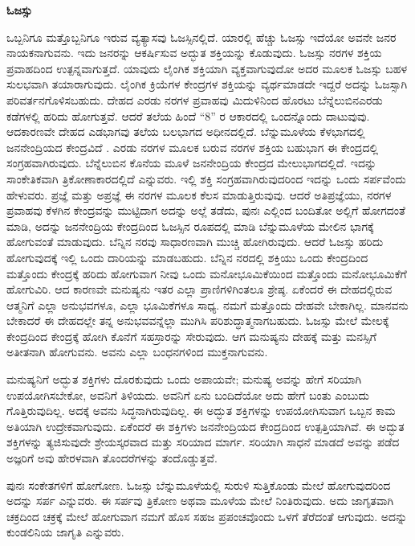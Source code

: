 \centerline{\textbf{ಓಜಸ್ಸು}}

ಒಬ್ಬನಿಗೂ ಮತ್ತೊಬ್ಬನಿಗೂ ಇರುವ ವ್ಯತ್ಯಾಸವು ಓಜಸ್ಸಿನಲ್ಲಿದೆ. ಯಾರಲ್ಲಿ ಹೆಚ್ಚು ಓಜಸ್ಸು ಇದೆಯೋ ಅವನೇ ಜನರ ನಾಯಕನಾಗುವನು. ಇದು ಜನರನ್ನು ಆಕರ್ಷಿಸುವ ಅದ್ಭುತ ಶಕ್ತಿಯನ್ನು ಕೊಡುವುದು. ಓಜಸ್ಸು ನರಗಳ ಶಕ್ತಿಯ ಪ್ರವಾಹದಿಂದ  ಉತ್ಪನ್ನವಾಗುತ್ತದೆ. ಯಾವುದು ಲೈಂಗಿಕ ಶಕ್ತಿಯಾಗಿ ವ್ಯಕ್ತವಾಗುವುದೋ ಅದರ ಮೂಲಕ ಓಜಸ್ಸು ಬಹಳ ಸುಲಭವಾಗಿ ತಯಾರಾಗುವುದು. ಲೈಂಗಿಕ ಕ್ರಿಯೆಗಳ ಕೇಂದ್ರಗಳ ಶಕ್ತಿಯನ್ನು ವ್ಯರ್ಥಮಾಡದೇ ಇದ್ದರೆ ಅದನ್ನು ಓಜಸ್ಸಾಗಿ ಪರಿವರ್ತನಗೊಳಿಸಬಹುದು. ದೇಹದ ಎರಡು ನರಗಳ ಪ್ರವಾಹವು ಮಿದುಳಿನಿಂದ ಹೊರಟು ಬೆನ್ನೆಲುಬಿನ\break ಎರಡು ಕಡೆಗಳಲ್ಲಿ ಹರಿದು ಹೋಗುತ್ತವೆ. ಆದರೆ ತಲೆಯ ಹಿಂದೆ “8” ರ ಆಕಾರದಲ್ಲಿ ಒಂದನ್ನೊಂದು ದಾಟುವುವು. ಆದಕಾರಣವೇ ದೇಹದ ಎಡಭಾಗವು ತಲೆಯ ಬಲಭಾಗದ ಅಧೀನದಲ್ಲಿದೆ. ಬೆನ್ನುಮೂಳೆಯ ಕೆಳಭಾಗದಲ್ಲಿ ಜನನೇಂದ್ರಿಯದ ಕೇಂದ್ರವಿದೆ . ಎರಡು ನರಗಳ ಮೂಲಕ ಬರುವ ನರಗಳ ಶಕ್ತಿಯ ಬಹುಭಾಗ ಈ ಕೇಂದ್ರದಲ್ಲಿ ಸಂಗ್ರಹವಾಗಿರುವುದು. ಬೆನ್ನೆಲುಬಿನ ಕೊನೆಯ ಮೂಳೆ ಜನನೇಂದ್ರಿಯ ಕೇಂದ್ರದ ಮೇಲುಭಾಗದಲ್ಲಿದೆ. ಇದನ್ನು ಸಾಂಕೇತಿಕವಾಗಿ ತ್ರಿಕೋಣಾಕಾರದಲ್ಲಿದೆ ಎನ್ನುವರು. ಇಲ್ಲಿ ಶಕ್ತಿ ಸಂಗ್ರಹವಾಗಿರುವುದರಿಂದ ಇದನ್ನು ಒಂದು ಸರ್ಪವೆಂದು ಹೇಳುವರು. ಪ್ರಜ್ಞೆ ಮತ್ತು ಅಪ್ರಜ್ಞೆ ಈ ನರಗಳ ಮೂಲಕ ಕೆಲಸ ಮಾಡುತ್ತಿರುವುವು. ಆದರೆ ಅತಿಪ್ರಜ್ಞೆಯು, ನರಗಳ ಪ್ರವಾಹವು ಕೆಳಗಿನ ಕೇಂದ್ರವನ್ನು ಮುಟ್ಟಿದಾಗ ಅದನ್ನು ಅಲ್ಲೆ ತಡೆದು, ಪುನಃ ಎಲ್ಲಿಂದ ಬಂದಿತೋ ಅಲ್ಲಿಗೆ ಹೋಗದಂತೆ ಮಾಡಿ, ಅದನ್ನು ಜನನೇಂದ್ರಿಯ ಕೇಂದ್ರದಿಂದ ಓಜಸ್ಸಿನ ರೂಪದಲ್ಲಿ ಮಾಡಿ ಬೆನ್ನುಮೂಳೆಯ ಮೇಲಿನ ಭಾಗಕ್ಕೆ ಹೋಗುವಂತೆ ಮಾಡುವುದು. ಬೆನ್ನಿನ ನರವು ಸಾಧಾರಣವಾಗಿ ಮುಚ್ಚಿ ಹೋಗಿರುವುದು. ಆದರೆ ಓಜಸ್ಸು ಹರಿದು ಹೋಗುವುದಕ್ಕೆ ಇಲ್ಲಿ ಒಂದು ದಾರಿಯನ್ನು ಮಾಡಬಹುದು. ಬೆನ್ನಿನ ನರದಲ್ಲಿ ಶಕ್ತಿಯು ಒಂದು ಕೇಂದ್ರದಿಂದ ಮತ್ತೊಂದು ಕೇಂದ್ರಕ್ಕೆ ಹರಿದು ಹೋಗುವಾಗ ನೀವು ಒಂದು ಮನೋಭೂಮಿಕೆಯಿಂದ ಮತ್ತೊಂದು ಮನೋಭೂಮಿಕೆಗೆ ಹೋಗುವಿರಿ. ಆದ ಕಾರಣವೇ ಮನುಷ್ಯನು ಇತರ ಎಲ್ಲಾ ಪ್ರಾಣಿಗಳಿಗಿಂತಲೂ ಶ್ರೇಷ್ಠ. ಏಕೆಂದರೆ ಈ ದೇಹದಲ್ಲಿರುವ ಆತ್ಮನಿಗೆ ಎಲ್ಲಾ ಅನುಭವಗಳೂ, ಎಲ್ಲಾ ಭೂಮಿಕೆಗಳೂ ಸಾಧ್ಯ. ನಮಗೆ ಮತ್ತೊಂದು ದೇಹವೇ ಬೇಕಾಗಿಲ್ಲ. ಮಾನವನು ಬೇಕಾದರೆ ಈ ದೇಹದಲ್ಲೇ ತನ್ನ ಅನುಭವವನ್ನೆಲ್ಲಾ ಮುಗಿಸಿ ಪರಿಶುದ್ಧಾತ್ಮನಾಗಬಹುದು. ಓಜಸ್ಸು ಮೇಲೆ ಮೇಲಕ್ಕೆ ಕೇಂದ್ರದಿಂದ ಕೇಂದ್ರಕ್ಕೆ ಹೋಗಿ ಕೊನೆಗೆ ಸಹಸ್ರಾರನ್ನು ಸೇರುವುದು. ಆಗ ಮನುಷ್ಯನು ದೇಹಕ್ಕೆ ಮತ್ತು ಮನಸ್ಸಿಗೆ ಅತೀತನಾಗಿ ಹೋಗುವನು. ಅವನು ಎಲ್ಲಾ ಬಂಧನಗಳಿಂದ ಮುಕ್ತನಾಗುವನು.

ಮನುಷ್ಯನಿಗೆ ಅದ್ಭುತ ಶಕ್ತಿಗಳು ದೊರಕುವುದು ಒಂದು ಅಪಾಯವೇ; ಮನುಷ್ಯ ಅವನ್ನು ಹೇಗೆ ಸರಿಯಾಗಿ ಉಪಯೋಗಿಸಬೇಕೋ, ಅವನಿಗೆ ತಿಳಿಯದು. ಅವನಿಗೆ ಏನು ಬಂದಿದೆಯೋ ಅದು ಹೇಗೆ ಬಂತು ಎಂಬುದು ಗೊತ್ತಿರುವುದಿಲ್ಲ. ಅದಕ್ಕೆ ಅವನು ಸಿದ್ಧನಾಗಿರುವುದಿಲ್ಲ. ಈ ಅದ್ಭುತ ಶಕ್ತಿಗಳನ್ನು ಉಪಯೋಗಿಸುವಾಗ ಒಬ್ಬನ ಕಾಮ ಅತಿಯಾಗಿ ಉದ್ರೇಕವಾಗುವುದು. ಏಕೆಂದರೆ ಈ ಶಕ್ತಿಗಳು ಜನನೇಂದ್ರಿಯದ ಕೇಂದ್ರದಿಂದ ಉತ್ಪತ್ತಿಯಾಗಿವೆ. ಈ ಅದ್ಭುತ ಶಕ್ತಿಗಳನ್ನು ತ್ಯಜಿಸುವುದೇ ಶ್ರೇಯಸ್ಕರವಾದ ಮತ್ತು ಸರಿಯಾದ ಮಾರ್ಗ. ಸರಿಯಾಗಿ ಸಾಧನೆ ಮಾಡದೆ ಅವನ್ನು ಪಡೆದ ಅಜ್ಞರಿಗೆ ಅವು ಹೇರಳವಾಗಿ ತೊಂದರೆಗಳನ್ನು ತಂದೊಡ್ಡುತ್ತವೆ.

ಪುನಃ ಸಂಕೇತಗಳಿಗೆ ಹೋಗೋಣ. ಓಜಸ್ಸು ಬೆನ್ನುಮೂಳೆಯಲ್ಲಿ ಸುರುಳಿ ಸುತ್ತಿಕೊಂಡು ಮೇಲೆ ಹೋಗುವುದರಿಂದ ಅದನ್ನು ಸರ್ಪ ಎನ್ನುವರು. ಈ ಸರ್ಪವು ತ್ರಿಕೋಣ ಅಥವಾ ಮೂಳೆಯ ಮೇಲೆ ನಿಂತಿರುವುದು. ಅದು ಜಾಗೃತವಾಗಿ ಚಕ್ರದಿಂದ ಚಕ್ರಕ್ಕೆ ಮೇಲೆ ಹೋಗುವಾಗ ನಮಗೆ ಹೊಸ ಸಹಜ ಪ್ರಪಂಚವೊಂದು ಒಳಗೆ ತೆರೆದಂತೆ ಆಗುವುದು. ಅದನ್ನು ಕುಂಡಲಿನಿಯ ಜಾಗೃತಿ ಎನ್ನುವರು.

